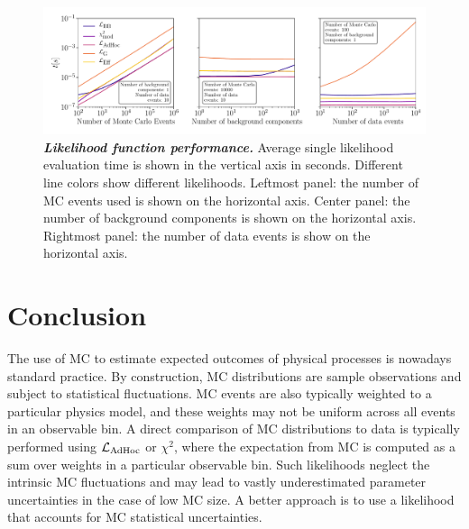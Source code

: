 \begin{figure}[ht]
	\centering
	\includegraphics[width=1\linewidth]{figures/stats_paper/fig7_multi_panel}
	\caption{\textbf{\textit{Likelihood function performance.}} Average single likelihood evaluation time is shown in the vertical axis in seconds. Different line colors show different likelihoods. Leftmost panel: the number of MC events used is shown on the horizontal axis. Center panel: the number of background components is shown on the horizontal axis. Rightmost panel: the number of data events is show on the horizontal axis.}
	\label{fig:performance}
\end{figure}

\section{Conclusion\label{sec:conclusion}}

The use of MC to estimate expected outcomes of physical processes is nowadays standard practice. By construction, MC distributions are sample observations and subject to statistical fluctuations. MC events are also typically weighted to a particular physics model, and these weights may not be uniform across all events in an observable bin. 
A direct comparison of MC distributions to data is typically performed using $\mathcal{L}_{\textmd{AdHoc}}$ or $\chi^2$, where the expectation from MC is computed as a sum over weights in a particular observable bin. Such likelihoods neglect the intrinsic MC fluctuations and may lead to vastly underestimated parameter uncertainties in the case of low MC size. A better approach is to use a likelihood that accounts for MC statistical uncertainties.

